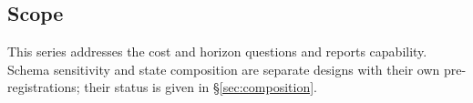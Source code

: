 \subsection{Scope}

This series addresses the cost and horizon questions and reports capability.
Schema sensitivity and state composition are separate designs with their own
pre-registrations; their status is given in \S\ref{sec:composition}.
